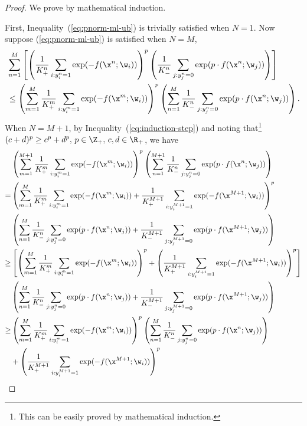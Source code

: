 \begin{proof}
We prove by mathematical induction.

First, Inequality~(\ref{eq:pnorm-ml-ub}) is trivially satisfied when $N=1$.
Now suppose (\ref{eq:pnorm-ml-ub}) is satisfied when $N=M$, \ie
\begin{equation}
\label{eq:induction-step}
\begin{aligned}
& \sum_{n=1}^M \left[
  \left( \frac{1}{K_+^n} \sum_{i:y_i^n=1} \exp(-f(\x^n; \w_i)) \right)^p 
  \left( \frac{1}{K_-^n} \sum_{j:y_j^n=0} \exp(p \cdot f(\x^n; \w_j)) \right) \right] \\
&\le 
 \left( \sum_{m=1}^M \frac{1}{K_+^m} \sum_{i:y_i^m=1} \exp(-f(\x^m; \w_i)) \right)^p 
 \left( \sum_{n=1}^M \frac{1}{K_-^n} \sum_{j:y_j^n=0} \exp(p \cdot f(\x^n; \w_j)) \right).
\end{aligned}
\end{equation}
When $N=M+1$, by Inequality~(\ref{eq:induction-step}) and noting that\footnote{This can be easily proved by mathematical induction.} 
$(c + d)^p \ge c^p + d^p, \, p \in \Z_+, \, c,d \in \R_+$,
we have
\begin{equation*}
\begin{aligned}
&  \left( \sum_{m=1}^{M+1} \frac{1}{K_+^m} \sum_{i:y_i^m=1} \exp(-f(\x^m; \w_i)) \right)^p 
   \left( \sum_{n=1}^{M+1} \frac{1}{K_-^n} \sum_{j:y_j^n=0} \exp(p \cdot f(\x^n; \w_j)) \right) \\
=& \left( \sum_{m=1}^M \frac{1}{K_+^m} \sum_{i:y_i^m=1} \exp(-f(\x^m; \w_i)) + 
   \frac{1}{K_+^{M+1}} \sum_{i:y_i^{M+1}=1} \exp(-f(\x^{M+1}; \w_i)) \right)^p \\
&  \left( \sum_{n=1}^M \frac{1}{K_-^n} \sum_{j:y_j^n=0} \exp(p \cdot f(\x^n; \w_j)) +
   \frac{1}{K_-^{M+1}} \sum_{j:y_j^{M+1}=0} \exp(p \cdot f(\x^{M+1}; \w_j)) \right) \\
\ge&
   \left[ \left( \sum_{m=1}^M \frac{1}{K_+^m} \sum_{i:y_i^m=1} \exp(-f(\x^m; \w_i)) \right)^p + 
   \left( \frac{1}{K_+^{M+1}} \sum_{i:y_i^{M+1}=1} \exp(-f(\x^{M+1}; \w_i)) \right)^p \right] \\
&  \left( \sum_{n=1}^M \frac{1}{K_-^n} \sum_{j:y_j^n=0} \exp(p \cdot f(\x^n; \w_j)) +
   \frac{1}{K_-^{M+1}} \sum_{j:y_j^{M+1}=0} \exp(p \cdot f(\x^{M+1}; \w_j)) \right) \\
\ge& 
   \left( \sum_{m=1}^M \frac{1}{K_+^m} \sum_{i:y_i^m=1} \exp(-f(\x^m; \w_i)) \right)^p
   \left( \sum_{n=1}^M \frac{1}{K_-^n} \sum_{j:y_j^n=0} \exp(p \cdot f(\x^n; \w_j)) \right) \\
& +\left( \frac{1}{K_+^{M+1}} \sum_{i:y_i^{M+1}=1} \exp(-f(\x^{M+1}; \w_i)) \right)^p

\end{aligned}
\end{equation*}
\end{proof}
